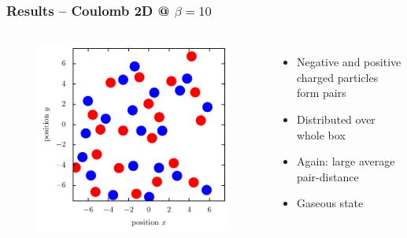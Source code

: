 \documentclass[mathserif,serif]{beamer}
\begin{document}
\begin{frame}
	\frametitle{Results -- Coulomb 2D @ $\beta=10$}
	\centering
	\begin{columns}	
	\begin{figure}
	\includegraphics[width=\textwidth]{../report/figures/Gas_1_beta_10.pdf}
	\end{figure}
	\begin{itemize}
	\item Negative and positive charged particles form pairs
	\item Distributed over whole box
	\item Again: large average pair-distance
	\item Gaseous state
	\end{itemize}
\end{columns}
\end{frame}
\end{document}
